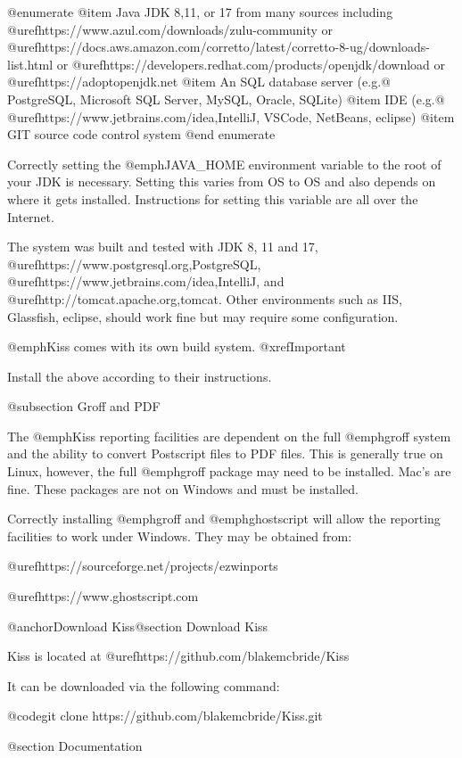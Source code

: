@enumerate
@item
Java JDK 8,11, or 17 from many sources including @uref{https://www.azul.com/downloads/zulu-community} or 
@uref{https://docs.aws.amazon.com/corretto/latest/corretto-8-ug/downloads-list.html} or
@uref{https://developers.redhat.com/products/openjdk/download} or
@uref{https://adoptopenjdk.net}
@item
An SQL database server (e.g.@ PostgreSQL, Microsoft SQL Server, MySQL,
Oracle, SQLite)
@item
IDE (e.g.@ @uref{https://www.jetbrains.com/idea,IntelliJ}, VSCode, NetBeans, eclipse)
@item
GIT source code control system
@end enumerate

Correctly setting the @emph{JAVA_HOME} environment variable to the root of your
JDK is necessary.  Setting this varies from OS to OS and also depends on where it
gets installed.  Instructions for setting this variable are all over the Internet.

The system was built and tested with JDK 8, 11 and 17,
@uref{https://www.postgresql.org,PostgreSQL},
@uref{https://www.jetbrains.com/idea,IntelliJ}, and
@uref{http://tomcat.apache.org,tomcat}.  Other environments such as
IIS, Glassfish, eclipse, should work fine but may require some
configuration.

@emph{Kiss} comes with its own build system.  @xref{Important}

Install the above according to their instructions.

@subsection Groff and PDF

The @emph{Kiss} reporting facilities are dependent on the full
@emph{groff} system and the ability to convert Postscript files to PDF
files.  This is generally true on Linux, however, the full
@emph{groff} package may need to be installed.  Mac's are fine.  These
packages are not on Windows and must be installed.

Correctly installing @emph{groff} and @emph{ghostscript} will allow the
reporting facilities to work under Windows.  They may be obtained from:

@uref{https://sourceforge.net/projects/ezwinports}

@uref{https://www.ghostscript.com}


@anchor{Download Kiss}@section Download Kiss

Kiss is located at @uref{https://github.com/blakemcbride/Kiss}

It can be downloaded via the following command:

@code{git clone https://github.com/blakemcbride/Kiss.git}

@section Documentation

